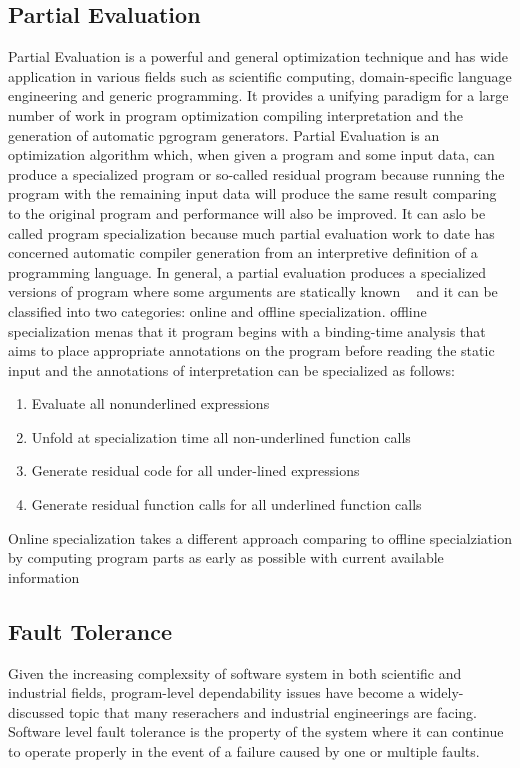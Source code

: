 \subsection{Partial Evaluation}
Partial Evaluation is a powerful and general optimization technique and has wide application in various fields such as scientific computing, domain-specific language engineering and generic programming.
It provides a unifying paradigm for a large number of work in program optimization compiling interpretation and the generation of automatic pgrogram generators.
Partial Evaluation is an optimization algorithm which, when given a program and some input data, can produce a specialized program or so-called residual program because running the program with the remaining input data will produce the same result comparing to the original program and performance will also be improved.
It can aslo be called program specialization because much partial evaluation work to date has concerned automatic compiler generation from an interpretive definition of a programming language.
In general, a partial evaluation produces a specialized versions of program where some arguments are statically known ~\cite{Jones1} and it can be classified into two categories: online and offline specialization. offline specialization menas that it program begins with a binding-time analysis that aims to place appropriate annotations on the program before reading the static input and the annotations of interpretation can be specialized as follows:
\begin{enumerate}
\item Evaluate all nonunderlined expressions
\item Unfold at specialization time all non-underlined function calls
\item Generate residual code for all under-lined expressions
\item Generate residual function calls for all underlined function calls
\end{enumerate}
Online specialization takes a different approach comparing to offline specialziation by computing program parts as early as possible with current available information 

\subsection{Fault Tolerance}
Given the increasing complexsity of software system in both scientific and industrial fields, program-level dependability issues have become a widely-discussed topic that many reserachers and industrial engineerings are facing. Software level fault tolerance is the property of the system where it can continue to operate properly in the event of a failure caused by one or multiple faults.

